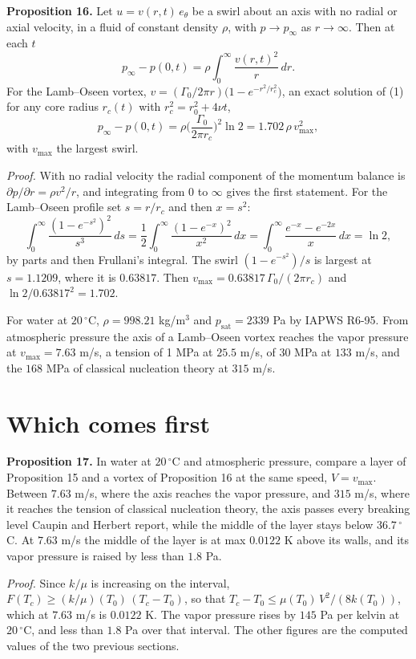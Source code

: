 \textbf{Proposition 16.} Let $u = v(r,t)\,e_\theta$ be a swirl about an axis with no radial or
axial velocity, in a fluid of constant density $\rho$, with $p \to p_\infty$ as $r\to\infty$. Then
at each $t$
\[
p_\infty - p(0,t) = \rho\int_0^\infty \frac{v(r,t)^2}{r}\,dr .
\]
For the Lamb--Oseen vortex, $v = (\Gamma_0/2\pi r)\big(1 - e^{-r^2/r_c^2}\big)$, an exact solution
of (1) for any core radius $r_c(t)$ with $r_c^2 = r_0^2 + 4\nu t$,
\[
p_\infty - p(0,t) = \rho\Big(\frac{\Gamma_0}{2\pi r_c}\Big)^2\ln 2 = 1.702\,\rho\,v_{\max}^2 ,
\]
with $v_{\max}$ the largest swirl.

\emph{Proof.} With no radial velocity the radial component of the momentum balance is
$\partial p/\partial r = \rho v^2/r$, and integrating from $0$ to $\infty$ gives the first
statement. For the Lamb--Oseen profile set $s = r/r_c$ and then $x = s^2$:
\[
\int_0^\infty\frac{(1-e^{-s^2})^2}{s^3}\,ds = \frac12\int_0^\infty\frac{(1-e^{-x})^2}{x^2}\,dx
= \int_0^\infty\frac{e^{-x} - e^{-2x}}{x}\,dx = \ln 2,
\]
by parts and then Frullani's integral. The swirl $(1 - e^{-s^2})/s$ is largest at $s = 1.1209$,
where it is $0.63817$. Then $v_{\max} = 0.63817\,\Gamma_0/(2\pi r_c)$ and
$\ln 2/0.63817^2 = 1.702$. \hfill\qedsymbol

For water at $20\,^\circ$C, $\rho = 998.21$ kg/m$^3$ and $p_{\mathrm{sat}} = 2339$ Pa by IAPWS
R6-95. From atmospheric pressure the axis of a Lamb--Oseen vortex reaches the vapor pressure at
$v_{\max} = 7.63$ m/s, a tension of 1 MPa at $25.5$ m/s, of 30 MPa at $133$ m/s, and the $168$ MPa
of classical nucleation theory at $315$ m/s.

\section{Which comes first}

\textbf{Proposition 17.} In water at $20\,^\circ$C and atmospheric pressure, compare a layer of
Proposition 15 and a vortex of Proposition 16 at the same speed, $V = v_{\max}$. Between $7.63$
m/s, where the axis reaches the vapor pressure, and $315$ m/s, where it reaches the tension of
classical nucleation theory, the axis passes every breaking level Caupin and Herbert report, while
the middle of the layer stays below $36.7\,^\circ$C. At $7.63$ m/s the middle of the layer is at
max $0.0122$ K above its walls, and its vapor pressure is raised by less than $1.8$ Pa.

\emph{Proof.} Since $k/\mu$ is increasing on the interval, $F(T_c) \ge (k/\mu)(T_0)\,(T_c - T_0)$,
so that $T_c - T_0 \le \mu(T_0)\,V^2/(8k(T_0))$, which at $7.63$ m/s is $0.0122$ K. The vapor
pressure rises by $145$ Pa per kelvin at $20\,^\circ$C, and less than $1.8$ Pa over that interval.
The other figures are the computed values of the two previous sections. \hfill\qedsymbol

